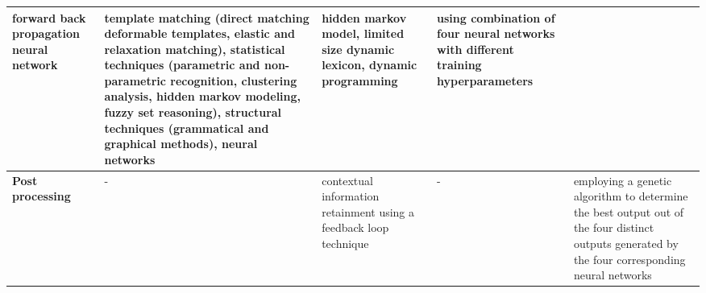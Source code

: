 \documentclass[main.tex]{subfiles}
\begin{document}
\begin{center}
\begin{longtable}{ | m{7em} | m{8em} | m{8em} | m{8em} | m{8em} | }
	forward back propagation neural network & \footnotesize template matching 
	(direct matching deformable templates, elastic and relaxation matching), 
	statistical techniques (parametric and non-parametric recognition, 
	clustering analysis, hidden markov modeling, fuzzy set reasoning), 
	structural techniques (grammatical and graphical methods), neural networks &
	\footnotesize hidden markov model, limited size dynamic lexicon, dynamic 
	programming & \footnotesize using combination of four neural networks with 
	different training hyperparameters \\
\hline
\textbf{Post processing} & \footnotesize - & \footnotesize contextual 
	information retainment using a feedback loop technique & \footnotesize - &
	\footnotesize employing a genetic algorithm to determine the best output out
	of the four distinct outputs generated by the four corresponding neural
	networks \\
\hline
\end{longtable}
\end{center}
\end{document}
